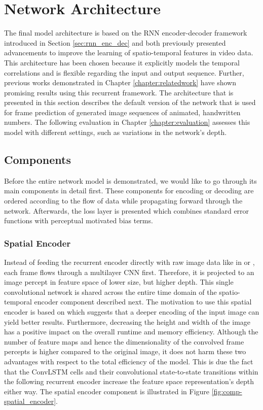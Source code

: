 \section{Network Architecture}

The final model architecture is based on the RNN encoder-decoder framework introduced in Section \ref{sec:rnn_enc_dec} and both previously presented advancements to improve the learning of spatio-temporal features in video data. This architecture has been chosen because it explicitly models the temporal correlations and is flexible regarding the input and output sequence. Further, previous works demonstrated in Chapter \ref{chapter:relatedwork} have shown promising results using this recurrent framework. The architecture that is presented in this section describes the default version of the network that is used for frame prediction of generated image sequences of animated, handwritten numbers. The following evaluation in Chapter \ref{chapter:evaluation} assesses this model with different settings, such as variations in the network's depth.

\subsection{Components} \label{sec:impl-components}

Before the entire network model is demonstrated, we would like to go through its main components in detail first. These components for encoding or decoding are ordered according to the flow of data while propagating forward through the network. Afterwards, the loss layer is presented which combines standard error functions with perceptual motivated bias terms.

\subsubsection{Spatial Encoder}

Instead of feeding the recurrent encoder directly with raw image data like in \parencite{unsup_learn_lstm} or \parencite{conv_lstm_nowcasting}, each frame flows through a multilayer CNN first. Therefore, it is projected to an image percept in feature space of lower size, but higher depth. This single convolutional network is shared across the entire time domain of the spatio-temporal encoder component described next. The motivation to use this spatial encoder is based on \parencite{spat_temp_video_autoenc} which suggests that a deeper encoding of the input image can yield better results. Furthermore, decreasing the height and width of the image has a positive impact on the overall runtime and memory efficiency. Although the number of feature maps and hence the dimensionality of the convolved frame percepts is higher compared to the original image, it does not harm these two advantages with respect to the total efficiency of the model. This is due the fact that the ConvLSTM cells and their convolutional state-to-state transitions within the following recurrent encoder increase the feature space representation's depth either way. The spatial encoder component is illustrated in Figure \ref{fig:comp-spatial_encoder}.






